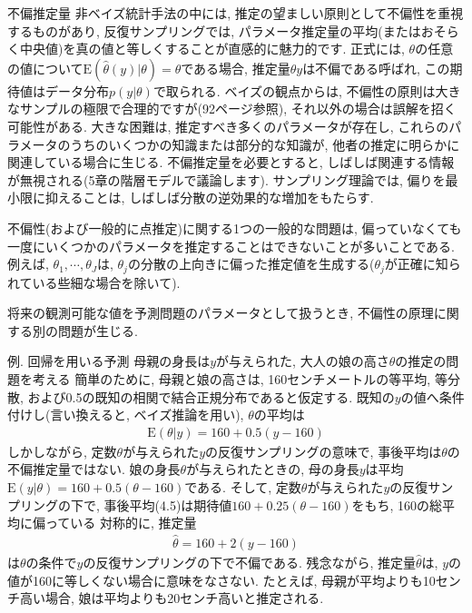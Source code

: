 \documentclass[10pt,dvipdfmx,a4]{beamer}
\newcommand{\eq}[1]{\begin{align}#1\end{align}}
\newcommand{\eqn}[1]{\begin{align*}#1\end{align*}}
\begin{document}
\begin{frame}{不偏推定量}
非ベイズ統計手法の中には, 推定の望ましい原則として不偏性を重視するものがあり, 反復サンプリングでは, パラメータ推定量の平均(またはおそらく中央値)を真の値と等しくすることが直感的に魅力的です.
正式には, $\theta$の任意の値について$\text{E}(\hat{\theta}(y)|\theta)=\theta$である場合, 推定量$\theta y$は不偏である呼ばれ, この期待値はデータ分布$p(y|\theta)$で取られる.
ベイズの観点からは, 不偏性の原則は大きなサンプルの極限で合理的ですが(92ページ参照), それ以外の場合は誤解を招く可能性がある.
大きな困難は, 推定すべき多くのパラメータが存在し, これらのパラメータのうちのいくつかの知識または部分的な知識が, 他者の推定に明らかに関連している場合に生じる.
不偏推定量を必要とすると, しばしば関連する情報が無視される(5章の階層モデルで議論します).
サンプリング理論では, 偏りを最小限に抑えることは, しばしば分散の逆効果的な増加をもたらす.

不偏性(および一般的に点推定)に関する1つの一般的な問題は, 偏っていなくても一度にいくつかのパラメータを推定することはできないことが多いことである.
例えば, $\theta_1, \cdots,\theta_J$は, $\theta_j$の分散の上向きに偏った推定値を生成する($\theta_j$が正確に知られている些細な場合を除いて).

将来の観測可能な値を予測問題のパラメータとして扱うとき, 不偏性の原理に関する別の問題が生じる.
\end{frame}


\begin{frame}{例. 回帰を用いる予測}
母親の身長は$y$が与えられた, 大人の娘の高さ$\theta$の推定の問題を考える
簡単のために, 母親と娘の高さは, 160センチメートルの等平均, 等分散, および0.5の既知の相関で結合正規分布であると仮定する.
既知の$y$の値へ条件付けし(言い換えると, ベイズ推論を用い), $\theta$の平均は
\eq{\text{E}(\theta|y)=160+0.5(y-160)}
しかしながら, 定数$\theta$が与えられた$y$の反復サンプリングの意味で, 事後平均は$\theta$の不偏推定量ではない.
娘の身長$\theta$が与えられたときの, 母の身長$y$は平均$\text{E}(y|\theta)=160+0.5(\theta-160)$である.
そして, 定数$\theta$が与えられた$y$の反復サンプリングの下で, 事後平均(4.5)は期待値$160+0.25(\theta-160)$をもち, 160の総平均に偏っている
対称的に, 推定量
\eqn{\hat{\theta}=160+2(y-160)}
は$\theta$の条件で$y$の反復サンプリングの下で不偏である.
残念ながら, 推定量$\hat{\theta}$は, $y$の値が160に等しくない場合に意味をなさない.
たとえば, 母親が平均よりも10センチ高い場合, 娘は平均よりも20センチ高いと推定される.
\end{frame}
\end{document}
